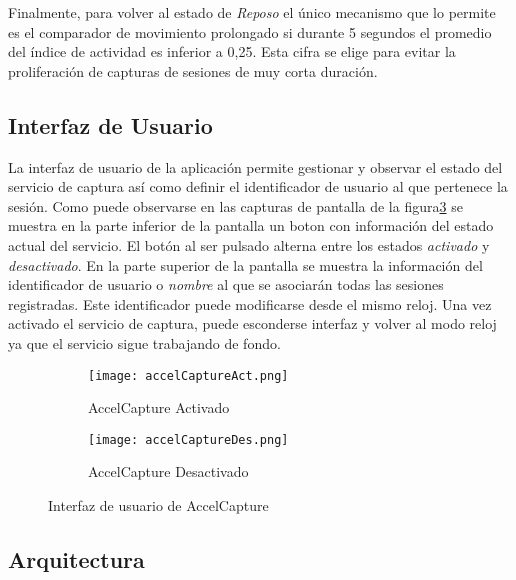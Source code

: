 Finalmente, para volver al estado de \textit{Reposo} el único mecanismo que lo permite es el comparador de movimiento prolongado si durante 5 segundos el promedio del índice de actividad es inferior a 0,25. Esta cifra se elige para evitar la proliferación de capturas de sesiones de muy corta duración.


\subsection{Interfaz de Usuario}\label{sub:accelcapture:interfaz}

La interfaz de usuario de la aplicación permite gestionar y observar el estado del servicio de captura así como definir el identificador de usuario al que pertenece la sesión. Como puede observarse en las capturas de pantalla de la figura\ref{fig:accelcapture:UI} se muestra en la parte inferior de la pantalla un boton con información del estado actual del servicio. El botón al ser pulsado alterna entre los estados \textit{activado} y \textit{desactivado}. En la parte superior de la pantalla se muestra la información del identificador de usuario o \textit{nombre} al que se asociarán todas las sesiones registradas. Este identificador puede modificarse desde el mismo reloj. Una vez activado el servicio de captura, puede esconderse interfaz y volver al modo reloj ya que el servicio sigue trabajando de fondo. 
\begin{figure}[htb!]
  \centering
  \begin{subfigure}[b]{0.4\textwidth}
      \centering
      \texttt{[image: accelCaptureAct.png]}
      \caption{AccelCapture Activado}
      \label{fig:accelCapture:UI1}
  \end{subfigure}
  \hfill
  \begin{subfigure}[b]{0.4\textwidth}
      \centering
      \texttt{[image: accelCaptureDes.png]}
      \caption{AccelCapture Desactivado}
      \label{fig:accelCapture:UI2}
  \end{subfigure}
  \caption{\label{fig:accelcapture:UI} Interfaz de usuario de AccelCapture}
\end{figure}


\subsection{Arquitectura}\label{sub:accelcapture:archi}


